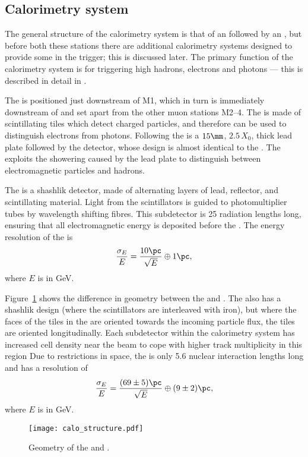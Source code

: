 \subsection{Calorimetry system}

The general structure of the calorimetry system is that of an \ecal followed by an \hcal, but
before both these stations there are additional calorimetry systems designed to provide some \pid
in the trigger; this is discussed later.
The primary function of the calorimetry system is for triggering high \pt hadrons, electrons and
photons --- this is described in detail in .

The \spd is positioned just downstream of M1, which in turn is immediately downstream of \richtwo
and set apart from the other muon stations M2--4.
The \spd is made of scintillating tiles which detect charged particles, and therefore can be used
to distinguish electrons from photons.
Following the \spd is a $15\mm$, $2.5\,X_0$, thick lead plate followed by the \presh detector,
whose design is almost identical to the \spd.
The \presh exploits the showering caused by the lead plate to distinguish between electromagnetic
particles and hadrons.

The \ecal is a shashlik detector, made of alternating layers of lead, reflector, and scintillating
material.
Light from the scintillators is guided to photomultiplier tubes by wavelength shifting fibres.
This \ecal subdetector is 25 radiation lengths long,  ensuring that all electromagnetic energy is
deposited before the \hcal.
The energy resolution of the \ecal is
\begin{equation}
  \frac{\sigma_E}{E} = \frac{10\pc}{\sqrt{E}} \oplus 1\pc,
\end{equation}
where $E$ is in GeV.

Figure~\ref{fig:lhcb:calo} shows the difference in geometry between the \ecal and \hcal.
The \hcal also has a shashlik design (where the scintillators are interleaved with iron), but where
the faces of the tiles in the \ecal are oriented
towards the incoming particle flux, the \hcal tiles are oriented longitudinally.
Each subdetector within the calorimetry system has increased cell density near the beam to cope
with higher track multiplicity in this region
Due to restrictions in space, the \hcal is only 5.6 nuclear interaction lengths long and has a
resolution of
\begin{equation}
  \frac{\sigma_E}{E} = \frac{(69\pm5)\pc}{\sqrt{E}} \oplus (9\pm2)\pc,
\end{equation}
where $E$ is in GeV.

\begin{figure}
  \begin{center}
    \texttt{[image: calo\_structure.pdf]}
    \caption[Geometry of the LHCb hadron and electron calorimeters]
    {\small
      Geometry of the \lhcb \hcal and \ecal.
    }
    \label{fig:lhcb:calo}
  \end{center}
\end{figure}

